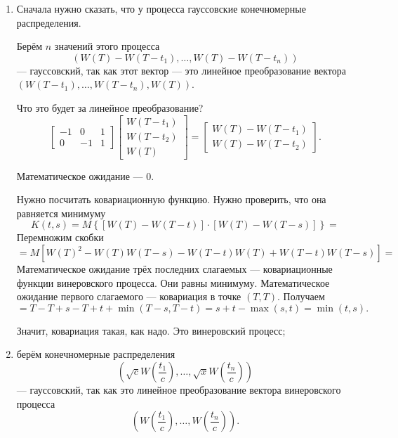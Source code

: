\begin{enumerate}[label=\alph*)]
  \item Сначала нужно сказать, что у процесса гауссовские конечномерные распределения.

  Берём $n$ значений этого процесса
  $$ \left( W \left( T \right) - W \left( T - t_1 \right), \dotsc,
    W \left( T \right) - W \left( T - t_n \right) \right) $$
  --- гауссовский, так как этот вектор --- это линейное преобразование вектора
  $ \left( W \left( T - t_1 \right), \dotsc, W \left( T - t_n \right), W \left( T \right) \right) $.

  Что это будет за линейное преобразование?
  $$ \begin{bmatrix}
      -1 & 0 & 1 \\
      0 & -1 & 1
    \end{bmatrix}
    \begin{bmatrix}
      W \left( T - t_1 \right) \\
      W \left( T - t_2 \right) \\
      W \left( T \right)
    \end{bmatrix} =
    \begin{bmatrix}
      W \left( T \right) - W \left( T - t_1 \right) \\
      W \left( T \right) - W \left( T - t_2 \right)
    \end{bmatrix}.$$

  Математическое ожидание --- 0.

  Нужно посчитать ковариационную функцию.
  Нужно проверить, что она равняется минимуму
  $$K \left( t, s \right) =
    M \left\{
      \left[ W \left( T \right) - W \left( T - t \right) \right] \cdot
      \left[ W \left( T \right) - W \left( T - s \right) \right] \right\} =$$
  Перемножим скобки
  $$= M \left[
      W \left( T \right)^2 - W \left( T \right) W \left( T - s \right) -
      W \left( T - t \right) W \left( T \right) + W \left( T - t \right) W \left( T - s \right)
    \right] =$$
  Математическое ожидание трёх последних слагаемых --- ковариационные функции винеровского процесса.
  Они равны минимуму.
  Математическое ожидание первого слагаемого --- ковариация в точке $ \left( T, T \right) $.
  Получаем
  $$= T - T + s - T + t + \min \left( T - s, T - t \right) =
    s + t - \max \left( s, t \right) =
    \min \left( t, s \right).$$

  Значит, ковариация такая, как надо.
  Это винеровский процесс;
  \item берём конечномерные распределения
  $$ \left(
      \sqrt{c} W \left( \frac{t_1}{c} \right), \dotsc, \sqrt{x} W \left( \frac{t_n}{c} \right)
    \right) $$
  --- гауссовский, так как это линейное преобразование вектора винеровского процесса
  $$ \left( W \left( \frac{t_1}{c} \right), \dotsc, W \left( \frac{t_n}{c} \right) \right).$$


\end{enumerate}
